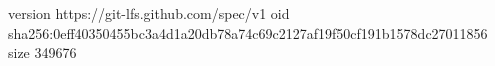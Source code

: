 version https://git-lfs.github.com/spec/v1
oid sha256:0eff40350455bc3a4d1a20db78a74c69c2127af19f50cf191b1578dc27011856
size 349676
